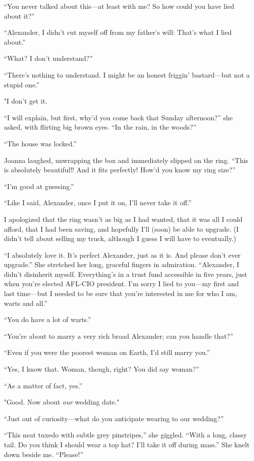 ``You never talked about this---at least with me? So how could you have
lied about it?''

``Alexander, I didn't cut myself off from my father's will: That's what
I lied about.''

``What? I don't understand?''

``There's nothing to understand. I might be an honest friggin'
bastard---but not a stupid one.''

"I don't get it.

``I will explain, but first, why'd you come back that Sunday
afternoon?'' she asked, with flirting big brown eyes. ``In the rain, in
the woods?''

``The house was locked.''

Joanna laughed, unwrapping the box and immediately slipped on the ring.
``This is absolutely beautiful!! And it fits perfectly! How'd you know
my ring size?''

``I'm good at guessing.''

``Like I said, Alexander, once I put it on, I'll never take it off.''

I apologized that the ring wasn't as big as I had wanted, that it was
all I could afford, that I had been saving, and hopefully I'll (soon) be
able to upgrade. (I didn't tell about selling my truck, although I guess
I will have to eventually.)

``I absolutely love it. It's perfect Alexander, just as it is. And
please don't ever upgrade.'' She stretched her long, graceful fingers in
admiration. ``Alexander, I didn't disinherit myself. Everything's in a
trust fund accessible in five years, just when you're elected AFL-CIO
president. I'm sorry I lied to you---my first and last time---but I
needed to be sure that you're interested in me for who I am, warts and
all.''

``You do have a lot of warts.''

``You're about to marry a very rich broad Alexander; can you handle
that?''

``Even if you were the poorest woman on Earth, I'd still marry you.''

``Yes, I know that. Woman, though, right? You did say woman?''

``As a matter of fact, yes.''

"Good. Now about \emph{our} wedding date."

``Just out of curiosity---what do you anticipate wearing to our
wedding?''

``This neat tuxedo with subtle grey pinstripes,'' she giggled. ``With a
long, classy tail. Do you think I should wear a top hat? I'll take it
off during mass.'' She knelt down beside me. ``Please!''

